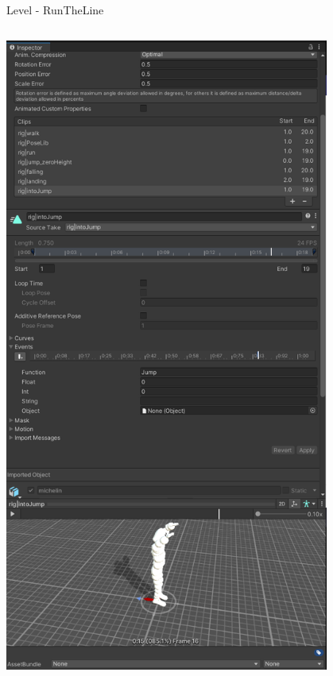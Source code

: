 \documentclass[xcolor=dvipsnames]{beamer}
\begin{document}
\begin{frame}{Level - RunTheLine}
\begin{columns}
\begin{column}{0.5\textwidth}
\begin{center}
		\includegraphics[width=0.8\textwidth]{jumpsound.png}
	\end{center}
\end{column}
\end{columns}

\end{frame}
\end{document}
